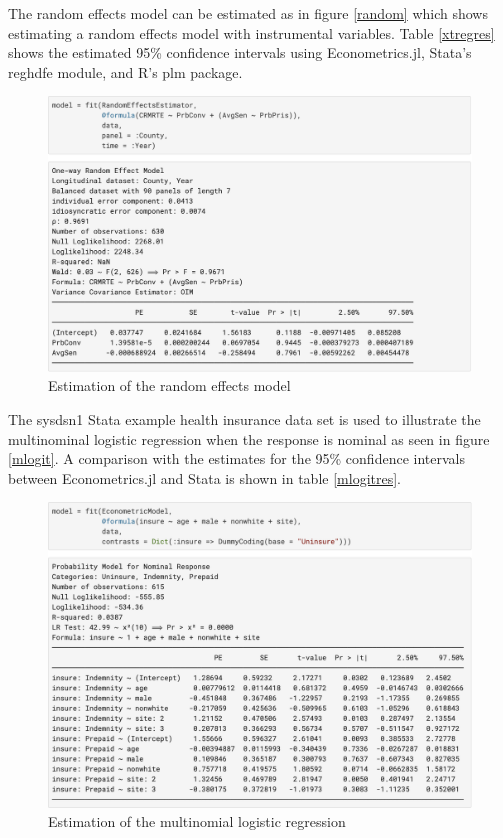 \documentclass{juliacon}
\begin{document}
\newpage

The random effects model can be estimated as in figure \vref{random} which shows estimating a random effects model with instrumental variables. Table \vref{xtregres} shows the estimated 95\% confidence intervals using Econometrics.jl, Stata's reghdfe module, and R's plm package.

\begin{figure}[hbpt]
	\includegraphics[max width=\linewidth,center]{estimator_ivre}
	\caption{Estimation of the random effects model}
	\label{random}
\end{figure}

The sysdsn1 Stata example health insurance data set is used to illustrate the multinominal logistic regression when the response is nominal as seen in figure \vref{mlogit}. A comparison with the estimates for the 95\% confidence intervals between Econometrics.jl and Stata is shown in table \vref{mlogitres}.

\begin{figure}[hbpt]
	\includegraphics[max width=\linewidth,center]{estimator_mlogit}
	\caption{Estimation of the multinomial logistic regression}
	\label{mlogit}
\end{figure}
\end{document}
